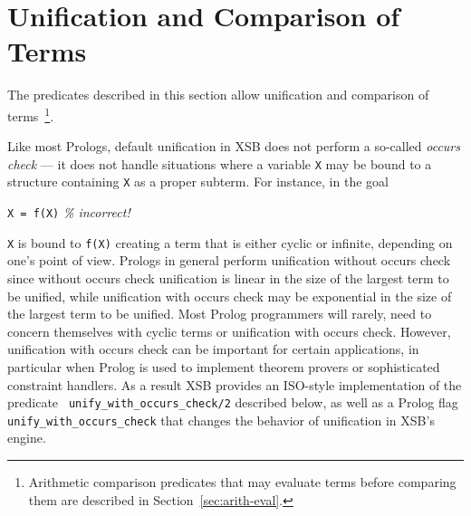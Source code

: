 \section{Unification and Comparison of Terms} \label{Comparison}

The predicates described in this section allow unification and
comparison of terms~\footnote{Arithmetic comparison predicates that
may evaluate terms before comparing them are described in
Section~\ref{sec:arith-eval}.}.

Like most Prologs, default unification in XSB does not perform a
so-called {\em occurs check} --- it does not handle situations where a
variable {\tt X} may be bound to a structure containing {\tt X} as a
proper subterm.  For instance, in the goal

{\tt X = f(X)}    {\em \% incorrect!}

{\tt X} is bound to {\tt f(X)} creating a term that is either cyclic
or infinite, depending on one's point of view.  Prologs in general
perform unification without occurs check since without occurs check
unification is linear in the size of the largest term to be unified,
while unification with occurs check may be exponential in the size of
the largest term to be unified.  Most Prolog programmers will rarely,
need to concern themselves with cyclic terms or unification with
occurs check.  However, unification with occurs check can be important
for certain applications, in particular when Prolog is used to
implement theorem provers or sophisticated constraint handlers.  As a
result XSB provides an ISO-style implementation of the predicate {\tt
  unify\_with\_occurs\_check/2} described below, as well as a Prolog
flag {\tt unify\_with\_occurs\_check} that changes the behavior of
unification in XSB's engine.

